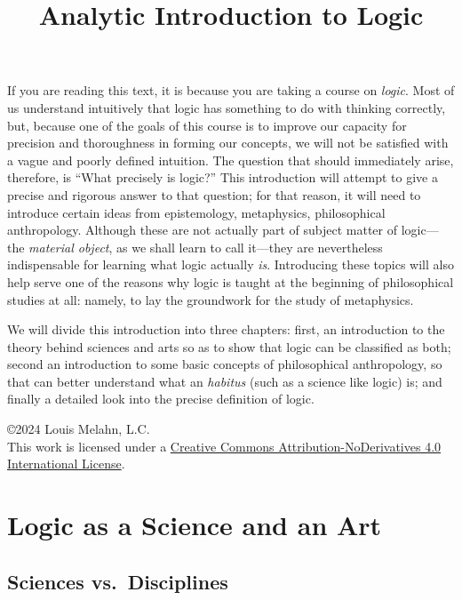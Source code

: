 \documentclass[
  12pt,
]{memoir}
\title{Analytic Introduction to Logic}
\author{}
\date{}
\begin{document}
\frontmatter
\maketitle

\mainmatter
If you are reading this text, it is because you are taking a course on
\emph{logic}. Most of us understand intuitively that logic has something
to do with thinking correctly, but, because one of the goals of this
course is to improve our capacity for precision and thoroughness in
forming our concepts, we will not be satisfied with a vague and poorly
defined intuition. The question that should immediately arise,
therefore, is ``What precisely is logic?'' This introduction will
attempt to give a precise and rigorous answer to that question; for that
reason, it will need to introduce certain ideas from epistemology,
metaphysics, philosophical anthropology. Although these are not actually
part of subject matter of logic---the \emph{material object}, as we
shall learn to call it---they are nevertheless indispensable for
learning what logic actually \emph{is}. Introducing these topics will
also help serve one of the reasons why logic is taught at the beginning
of philosophical studies at all: namely, to lay the groundwork for the
study of metaphysics.

We will divide this introduction into three chapters: first, an
introduction to the theory behind sciences and arts so as to show that
logic can be classified as both; second an introduction to some basic
concepts of philosophical anthropology, so that can better understand
what an \emph{habitus} (such as a science like logic) is; and finally a
detailed look into the precise definition of logic.

\vfill

\noindent\copyright 2024 Louis Melahn, L.C.\\
This work is licensed under a
\href{http://creativecommons.org/licenses/by-nd/4.0/}{Creative Commons
Attribution-NoDerivatives 4.0 International License}.

\mainmatter

\chapter{Logic as a Science and an
Art}\label{logic-as-a-science-and-an-art}

\section{Sciences vs.~Disciplines}\label{sciences-vs.-disciplines}
\end{document}
